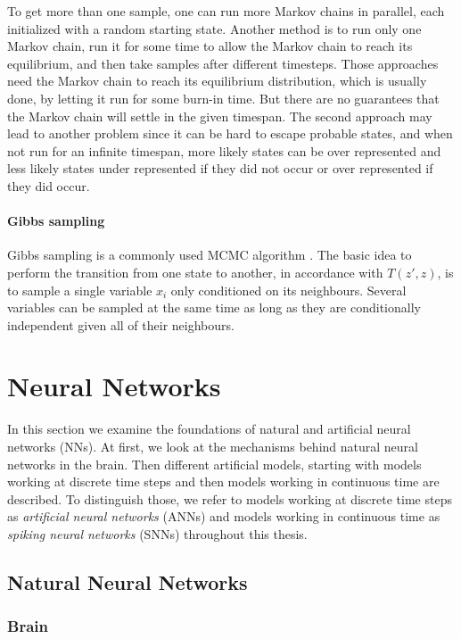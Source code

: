 To get more than one sample, one can run more Markov chains in parallel, each initialized with a random starting state. 
Another method is to run only one Markov chain, run it for some time to allow the Markov chain to reach its equilibrium, and then take samples after different timesteps.
Those approaches need the Markov chain to reach its equilibrium distribution, which is usually done, by letting it run for some burn-in time.
But there are no guarantees that the Markov chain will settle in the given timespan.    
The second approach may lead to another problem since it can be hard to escape probable states, and when not run for an infinite timespan, more likely states can be over represented and less likely states under represented if they did not occur or over represented if they did occur.  

\paragraph{Gibbs sampling} Gibbs sampling is a commonly used MCMC algorithm \cite{Goodfellow-et-al-2016-Book}. The basic idea to perform the transition from one state to another, in accordance with $T(z',z)$, is to sample a single variable $x_i$ only conditioned on its neighbours. 
Several variables can be sampled at the same time as long as they are conditionally independent given all of their neighbours.

\section{Neural Networks} \label{c:NNs}

In this section we examine the foundations of natural and artificial neural networks (NNs).
At first, we look at the mechanisms behind natural neural networks in the brain.
Then different artificial models, starting with models working at discrete time steps and then models working in continuous time are described.
To distinguish those, we refer to models working at discrete time steps as \textit{artificial neural networks} (ANNs) and models working in continuous time as \textit{spiking neural networks} (SNNs) throughout this thesis.

\subsection{Natural Neural Networks} \label{c:natural}
\subsubsection{Brain} \label{c:brain}

